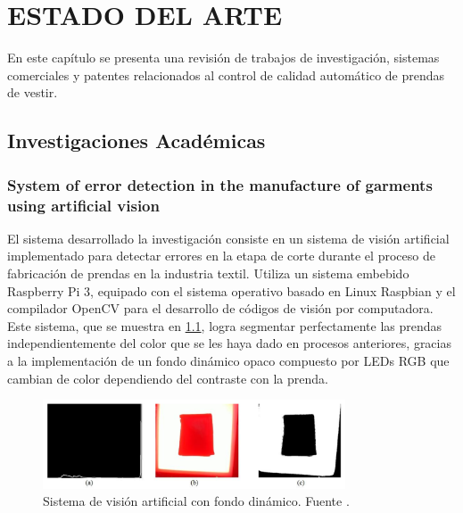 \chapter{\MakeUppercase{Estado del Arte}} \label{Estado del Arte}
\thispagestyle{mainmatterstyle} %

En este capítulo se presenta una revisión de trabajos de investigación, sistemas comerciales y patentes relacionados al control de calidad automático de prendas de vestir.

\section{Investigaciones Académicas}

\subsection{System of error detection in the manufacture of garments using artificial vision}

El sistema desarrollado la investigación \cite{Moreno2017} consiste en un sistema de visión artificial implementado para detectar errores en la etapa de corte durante el proceso de fabricación de prendas en la industria textil. Utiliza un sistema embebido Raspberry Pi 3, equipado con el sistema operativo basado en Linux Raspbian y el compilador OpenCV para el desarrollo de códigos de visión por computadora. Este sistema, que se muestra en \ref{fig:luz_sistema}, logra segmentar perfectamente las prendas independientemente del color que se les haya dado en procesos anteriores, gracias a la implementación de un fondo dinámico opaco compuesto por LEDs RGB que cambian de color dependiendo del contraste con la prenda.

\begin{figure}[H]
	\centering
	\includegraphics[width=0.8\textwidth]{img/luz_sistema.png}
	\caption[Sistema de visión artificial con fondo dinámico.]{Sistema de visión artificial con fondo dinámico. Fuente \cite{Moreno2017}.}
	\label{fig:luz_sistema}
\end{figure}

